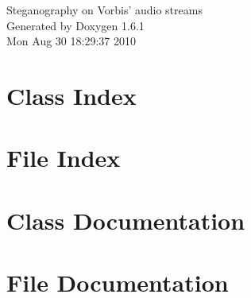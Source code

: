 \documentclass[a4paper]{book}
\begin{document}
\hypersetup{pageanchor=false}
\begin{titlepage}
\vspace*{7cm}
\begin{center}
{\Large Steganography on Vorbis' audio streams }\\
\vspace*{1cm}
{\large Generated by Doxygen 1.6.1}\\
\vspace*{0.5cm}
{\small Mon Aug 30 18:29:37 2010}\\
\end{center}
\end{titlepage}
\clearemptydoublepage
{}
\tableofcontents
\clearemptydoublepage
{}
\hypersetup{pageanchor=true}
\chapter{Class Index}

\chapter{File Index}

\chapter{Class Documentation}









\chapter{File Documentation}













\printindex
\end{document}

